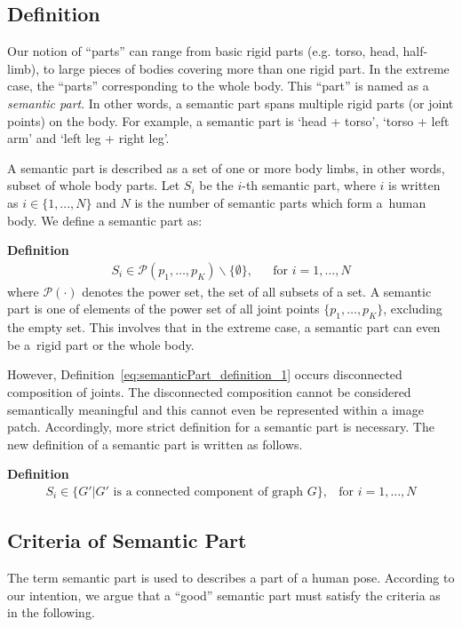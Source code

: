 \documentclass[master,english,final]{postech-ucs}
\begin{document}
\subsection{Definition}
\label{sec:semanticPart_definition}
Our notion of ``parts'' can range from basic rigid parts (e.g. torso, head, half-limb), to large pieces of bodies covering more than one rigid part. In the extreme case, the ``parts'' corresponding to the whole body. This ``part'' is named as a \emph{semantic part}. In other words, a semantic part spans multiple rigid parts (or joint points) on the body. For example, a semantic part is `head + torso', `torso + left arm' and `left leg + right leg'.

A semantic part is described as a set of one or more body limbs, in other words, subset of whole body parts. Let $S_i$ be the $i$-th semantic part, where $i$ is written as ${i \in \{1, ..., N\}}$ and $N$ is the number of semantic parts which form a~human body. We define a semantic part as:

\textbf{Definition}
\begin{eqnarray}\label{eq:semanticPart_definition_1}
S_i \in \mathcal{P} ( {p_1, \dots, p_K} ) \backslash \{\emptyset\} , && \text{for } i = 1, \dots, N
\end{eqnarray}
where $\mathcal{P} \left( \cdot \right)$ denotes the power set, the set of all subsets of a set. A semantic part is one of elements of the power set of all joint points $\{p_1, \dots, p_K\}$, excluding the empty set. This involves that in the extreme case, a semantic part can even be a~rigid part or the whole body.

However, Definition~\ref{eq:semanticPart_definition_1} occurs disconnected composition of joints. The disconnected composition cannot be considered semantically meaningful and this cannot even be represented within a image patch. Accordingly, more strict definition for a semantic part is necessary. The new definition of a semantic part is written as follows.

\textbf{Definition}
\begin{eqnarray}\label{eq:semanticPart_definition_2}
S_i \in \{G' | G' \text{ is a connected component of graph } G\} , & \text{for } i = 1, \dots, N
\end{eqnarray}



\subsection{Criteria of Semantic Part}
The term semantic part is used to describes a part of a human pose. According to our intention, we argue that a ``good'' semantic part must satisfy the criteria as in the following.
\end{document}
